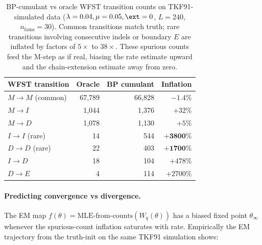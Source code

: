 \begin{table}[ht]
\centering\small
\begin{tabular}{lrrr}
\toprule
WFST transition & Oracle & BP cumulant & Inflation \\
\midrule
$M \to M$ (common) & 67{,}789 & 66{,}828 & $-1.4\%$ \\
$M \to I$          & 1{,}044  & 1{,}376  & $+32\%$ \\
$M \to D$          & 1{,}078  & 1{,}130  & $+5\%$ \\
$I \to I$ (rare)   & 14       & 544      & $\mathbf{+3800\%}$ \\
$D \to D$ (rare)   & 22       & 403      & $\mathbf{+1700\%}$ \\
$I \to D$          & 18       & 104      & $+478\%$ \\
$D \to E$          & 4        & 114      & $+2700\%$ \\
\bottomrule
\end{tabular}
\caption{BP-cumulant vs oracle WFST transition counts on
TKF91-simulated data ($\lambda = 0.04, \mu = 0.05, \ext = 0$,
$L = 240$, $n_{\text{fams}} = 30$).  Common
transitions match truth; rare transitions involving consecutive
indels or boundary $E$ are inflated by factors of $5\times$ to
$38\times$.  These spurious counts feed the M-step as if real,
biasing the rate estimate upward and the chain-extension estimate
away from zero.}
\label{tab:moment-mismatch-bias-pending}
\end{table}

\paragraph{Predicting convergence vs divergence.}
The EM map $f(\theta) = \text{MLE-from-counts}(W_q(\theta))$ has a
biased fixed point $\theta_\infty$ whenever the spurious-count
inflation saturates with rate.  Empirically the EM trajectory from
the truth-init on the same TKF91 simulation shows:

